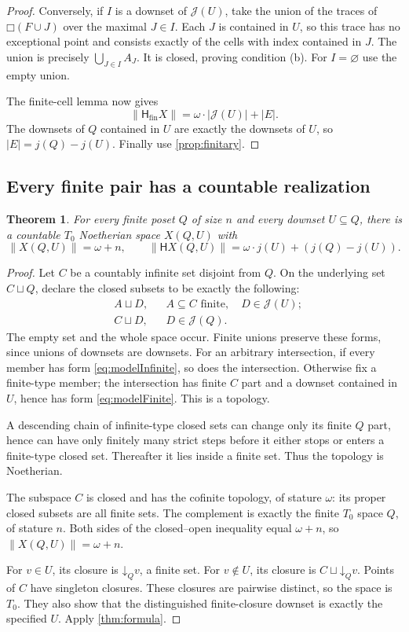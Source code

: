 \documentclass[11pt,a4paper]{article}
\newtheorem{theorem}{Theorem}[section]
\theoremstyle{definition}
\newcommand{\HH}{\mathsf H}
\newcommand{\Hfin}{\mathsf H_{\mathrm{fin}}}
\newcommand{\JJ}{\mathcal J}
\newcommand{\st}[1]{\lVert #1\rVert}
\newcommand{\boxF}[1]{\mathord{\Box}(#1)}
\newcommand{\ds}{\mathbin{\sqcup}}
\numberwithin{equation}{section}
\begin{document}
\begin{proof}
Conversely, if $I$ is a downset of $\JJ(U)$, take the union of the traces
of $\boxF{F\cup J}$ over the maximal $J\in I$.  Each $J$ is contained
in $U$, so this trace has no exceptional point and consists exactly
of the cells with index contained in $J$.  The union is precisely
$\bigcup_{J\in I}A_J$.  It is closed, proving condition (b).  For
$I=\varnothing$ use the empty union.

The finite-cell lemma now gives
\[
 \st{\Hfin X}=\omega\cdot|\JJ(U)|+|E|.
\]
The downsets of $Q$ contained in $U$ are exactly the downsets of $U$,
so $|E|=j(Q)-j(U)$.  Finally use \cref{prop:finitary}.
\end{proof}

\subsection{Every finite pair has a countable realization}

\begin{theorem}\label{thm:realization}
For every finite poset $Q$ of size $n$ and every downset $U\subseteq Q$,
there is a countable $T_0$ Noetherian space $X(Q,U)$ with
\[
 \st{X(Q,U)}=\omega+n,
 \qquad
 \st{\HH X(Q,U)}=\omega\cdot j(U)+(j(Q)-j(U)).
\]
\end{theorem}
\begin{proof}
Let $C$ be a countably infinite set disjoint from $Q$.  On the underlying
set $C\ds Q$, declare the closed subsets to be exactly the following:
\begin{align}
 & A\ds D, && A\subseteq C\text{ finite},\quad D\in\JJ(U);
       \label{eq:modelFinite}\\
 & C\ds D, && D\in\JJ(Q). \label{eq:modelInfinite}
\end{align}
The empty set and the whole space occur.  Finite unions preserve these
forms, since unions of downsets are downsets.  For an arbitrary
intersection, if every member has form \eqref{eq:modelInfinite}, so
does the intersection.  Otherwise fix a finite-type member; the
intersection has finite $C$ part and a downset contained in $U$, hence
has form \eqref{eq:modelFinite}.  This is a topology.

A descending chain of infinite-type closed sets can change only its
finite $Q$ part, hence can have only finitely many strict steps before
it either stops or enters a finite-type closed set.  Thereafter it lies
inside a finite set.  Thus the topology is Noetherian.

The subspace $C$ is closed and has the cofinite topology, of stature
$\omega$: its proper closed subsets are all finite sets.  The complement
is exactly the finite $T_0$ space $Q$, of stature $n$.  Both sides of
the closed--open inequality equal $\omega+n$, so
$\st{X(Q,U)}=\omega+n$.

For $v\in U$, its closure is $\mathord\downarrow_Q v$, a finite set.
For $v\notin U$, its closure is
$C\ds\mathord\downarrow_Q v$.  Points of $C$ have singleton closures.
These closures are pairwise distinct, so the space is $T_0$.
They also show that the distinguished finite-closure downset is exactly
the specified $U$.  Apply \cref{thm:formula}.
\end{proof}
\end{document}
